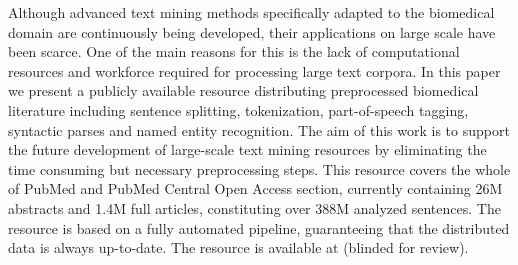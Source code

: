 Although advanced text mining methods specifically adapted to the biomedical domain are continuously being developed, their applications on large scale have been scarce. One of the main reasons for this is the lack of computational resources and workforce required for processing large text corpora. In this paper we present a publicly available resource distributing preprocessed biomedical literature including sentence splitting, tokenization, part-of-speech tagging, syntactic parses and named entity recognition. The aim of this work is to support the future development of large-scale text mining resources by eliminating the time consuming but necessary preprocessing steps. This resource covers the whole of PubMed and PubMed Central Open Access section, currently containing 26M abstracts and 1.4M full articles, constituting over 388M analyzed sentences. The resource is based on a fully automated pipeline, guaranteeing that the distributed data is always up-to-date. The resource is available at (blinded for review).
